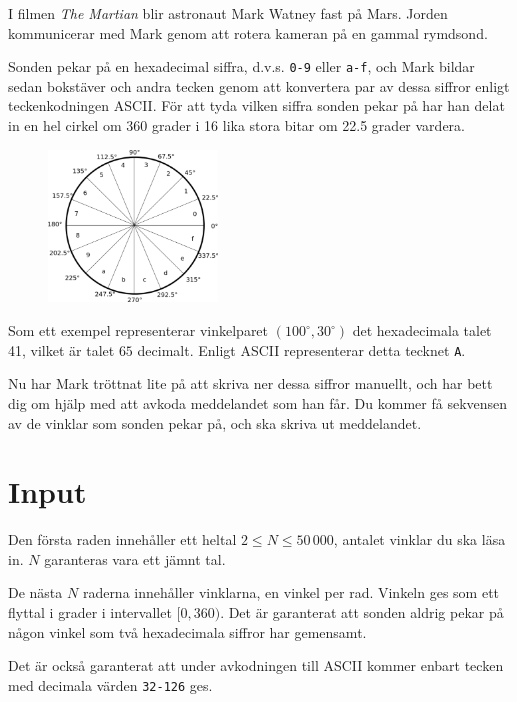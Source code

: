 I filmen \emph{The Martian} blir astronaut Mark Watney fast på Mars. Jorden kommunicerar med Mark genom att rotera
kameran på en gammal rymdsond.

Sonden pekar på en hexadecimal siffra, d.v.s. \texttt{0-9} eller \texttt{a-f}, och Mark bildar sedan bokstäver
och andra tecken genom att konvertera par av dessa siffror enligt teckenkodningen ASCII. För att tyda
vilken siffra sonden pekar på har han delat in en hel cirkel om 360 grader i 16 lika stora bitar om 22.5 grader
vardera.

\begin{figure}[h!]
  \begin{center}
    \includegraphics[width=0.4\textwidth]{angles.eps}
  \end{center}
\end{figure}

Som ett exempel representerar vinkelparet $(100^{\circ}, 30^{\circ})$ det hexadecimala talet 41, vilket är talet $65$ decimalt.
Enligt ASCII representerar detta tecknet \texttt{A}.

Nu har Mark tröttnat lite på att skriva ner dessa siffror manuellt, och har bett dig om hjälp med att avkoda meddelandet
som han får. Du kommer få sekvensen av de vinklar som sonden pekar på, och ska skriva ut meddelandet.

\section*{Input}
Den första raden innehåller ett heltal $2 \le N \le 50\,000$, antalet vinklar du ska läsa in. $N$ garanteras vara ett jämnt tal.

De nästa $N$ raderna innehåller vinklarna, en vinkel per rad. Vinkeln ges som ett flyttal i grader i intervallet $[0, 360)$.
Det är garanterat att sonden aldrig pekar på någon vinkel som två hexadecimala siffror har gemensamt.

Det är också garanterat att under avkodningen till ASCII kommer enbart tecken med decimala värden \texttt{32-126} ges.

